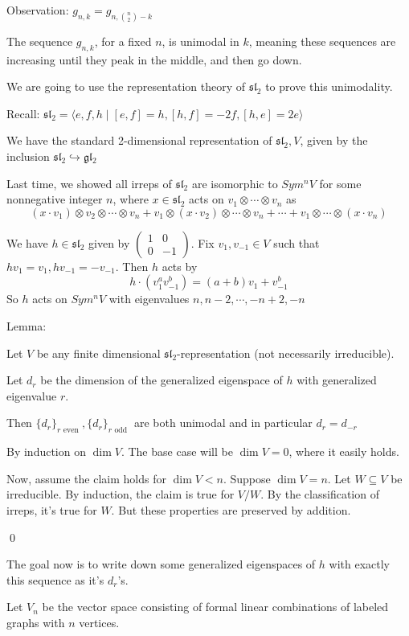 \documentclass[x11names,reqno,14pt]{extarticle}
\newcommand{\pmat}[4]{\begin{pmatrix} #1 & #2 \\ #3 & #4 \end{pmatrix}}
\newcommand{\mk}[1]{\mathfrak{#1}}
\newcommand{\into}{\hookrightarrow}
\newcommand{\gl}{\mk{g}\mk{l}}
\renewcommand{\sl}{\mk{s}\mk{l}}
\begin{document}
Observation: $g_{n,k} = g_{n, {n\choose 2}-k}$

\prop

The sequence $g_{n,k}$, for a fixed $n$, is unimodal in $k$, meaning these sequences are increasing until they peak in the middle, and then go down. 

\proof

We are going to use the representation theory of $\sl_2$ to prove this unimodality. 

Recall: $\sl_2 = \langle e,f,h\mid[e,f]=h,[h,f]=-2f,[h,e]=2e\rangle$

We have the standard 2-dimensional representation of $\sl_2, V$, given by the inclusion $\sl_2\into\gl_2$

Last time, we showed all irreps of $\sl_2$ are isomorphic to $Sym^nV$ for some nonnegative integer $n$, where $x \in \sl_2$ acts on $v_1\otimes\cdots\otimes v_n$ as 
\[
(x\cdot v_1)\otimes v_2\otimes\cdots\otimes v_n + v_1\otimes(x\cdot v_2)\otimes\cdots\otimes v_n + \cdots + v_1\otimes\cdots\otimes (x\cdot v_n)
\]

We have $h \in \sl_2$ given by $\pmat{1}{0}{0}{-1}$. Fix $v_1, v_{-1} \in V$ such that $hv_1 = v_1, hv_{-1} = -v_{-1}$. Then $h$ acts by 
\[
h\cdot(v_1^av_{-1}^b) = (a + b)v_1 + v_{-1}^b
\]
So $h$ acts on $Sym^nV$ with eigenvalues $n, n-2, \cdots, -n + 2, -n$

Lemma:

Let $V$ be any finite dimensional $\sl_2$-representation (not necessarily irreducible). 

\lem

Let $d_r$ be the dimension of the generalized eigenspace of $h$ with generalized eigenvalue $r$. 

Then $\{d_r\}_{r\text{ even }},\{d_r\}_{r\text{ odd }}$ are both unimodal and in particular $d_r = d_{-r}$

\proof

By induction on $\dim V$. The base case will be $\dim V = 0$, where it easily holds. 

Now, assume the claim holds for $\dim V < n$. Suppose $\dim V = n$. Let $W \subseteq V$ be irreducible. By induction, the claim is true for $V/W$. By the classification of irreps, it's true for $W$. But these properties are preserved by addition. 

\qed

The goal now is to write down some generalized eigenspaces of $h$ with exactly this sequence as it's $d_r$'s. 

Let $V_n$ be the vector space consisting of formal linear combinations of labeled graphs with $n$ vertices. 
\end{document}
